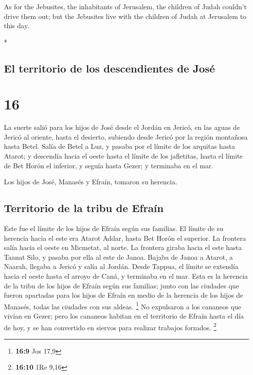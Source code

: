 \begin{paracol}{2}
\begin{otherlanguage}{english}
 As for the Jebusites, the inhabitants of Jerusalem, the
children of Judah couldn't drive them out; but the Jebusites live with
the children of Judah at Jerusalem to this day.

\end{otherlanguage}

\switchcolumn[0]*

\hypertarget{el-territorio-de-los-descendientes-de-josuxe9}{%
\subsection{El territorio de los descendientes de
José}\label{el-territorio-de-los-descendientes-de-josuxe9}}

\hypertarget{section-30}{%
\section{16}\label{section-30}}

 La suerte salió para los hijos de José desde el Jordán en
Jericó, en las aguas de Jericó al oriente, hasta el desierto, subiendo
desde Jericó por la región montañosa hasta Betel.  Salía
de Betel a Luz, y pasaba por el límite de los arquitas hasta Atarot;
 y descendía hacia el oeste hasta el límite de los
jafletitas, hasta el límite de Bet Horón el inferior, y seguía hasta
Gezer; y terminaba en el mar.

 Los hijos de José, Manasés y Efraín, tomaron su herencia.

\hypertarget{territorio-de-la-tribu-de-efrauxedn}{%
\subsection{Territorio de la tribu de
Efraín}\label{territorio-de-la-tribu-de-efrauxedn}}

 Este fue el límite de los hijos de Efraín según sus
familias. El límite de su herencia hacia el este era Atarot Addar, hasta
Bet Horón el superior.  La frontera salía hacia el oeste
en Micmetat, al norte. La frontera giraba hacia el este hasta Taanat
Silo, y pasaba por ella al este de Janoa.  Bajaba de Janoa
a Atarot, a Naarah, llegaba a Jericó y salía al Jordán. 
Desde Tappua, el límite se extendía hacia el oeste hasta el arroyo de
Caná, y terminaba en el mar. Esta es la herencia de la tribu de los
hijos de Efraín según sus familias;  junto con las
ciudades que fueron apartadas para los hijos de Efraín en medio de la
herencia de los hijos de Manasés, todas las ciudades con sus aldeas.
\footnote{\textbf{16:9} Jos 17,9}  No expulsaron a los
cananeos que vivían en Gezer; pero los cananeos habitan en el territorio
de Efraín hasta el día de hoy, y se han convertido en siervos para
realizar trabajos forzados. \footnote{\textbf{16:10} 1Re 9,16}


\end{paracol}
